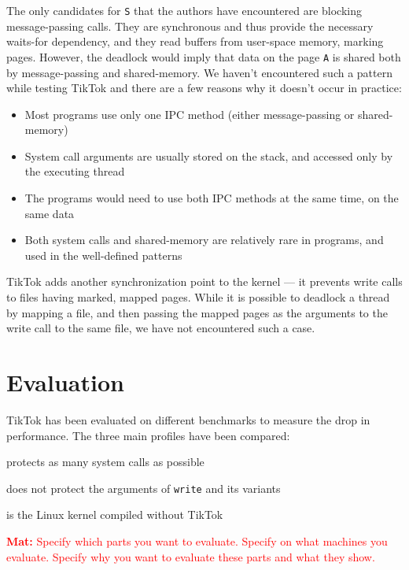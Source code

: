 \documentclass[conference]{IEEEtran}
\newcommand{\mat}[1]{\textcolor{red}{\textbf{Mat:} #1}}
\newcommand{\sysname}{TikTok}
\begin{document}
The only candidates for \texttt{S} that the authors have encountered are
blocking message-passing calls. They are synchronous and thus provide the
necessary waits-for dependency, and they read buffers from user-space memory, marking
pages. However, the deadlock would imply that data on the page \texttt{A} is shared both by
message-passing and shared-memory. We haven't encountered such a pattern while
testing \sysname{} and there are a few reasons why it doesn't occur in practice:

\begin{itemize}
  \item Most programs use only one IPC method (either message-passing or shared-memory)
  \item System call arguments are usually stored on the stack, and accessed only by the executing thread
  \item The programs would need to use both IPC methods at the same time, on the same data
  \item Both system calls and shared-memory are relatively rare in programs, and used in the well-defined patterns
\end{itemize}

\sysname{} adds another synchronization point to the kernel --- it prevents
write calls to files having marked, mapped pages. While it is possible to
deadlock a thread by mapping a file, and then passing the mapped pages as the
arguments to the write call to the same file, we have not encountered such a
case.

\section{Evaluation}
\label{sec:evaluation}

\sysname{} has been evaluated on different benchmarks to measure the drop in performance.
The three main profiles have been compared:
\begin{LaTeXdescription}
  \item[\sysname{} On] protects as many system calls as possible
  \item[\sysname{} Partial] does not protect the arguments of \texttt{write} and its variants
  \item[\sysname{} Off] is the Linux kernel compiled without \sysname{}  
\end{LaTeXdescription}

\mat{Specify which parts you want to evaluate. Specify on what machines you
evaluate. Specify why you want to evaluate these parts and what they show.}
\end{document}
